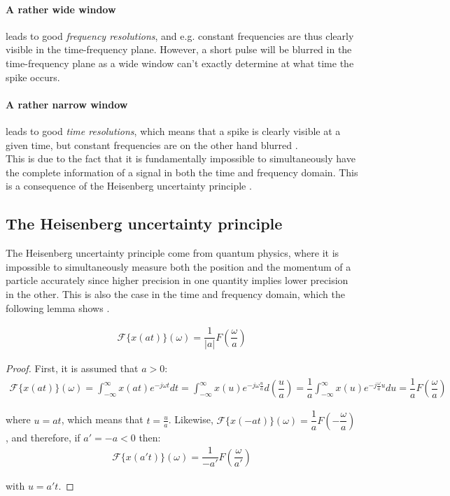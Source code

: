 \paragraph{A rather wide window} leads to good \textit{frequency resolutions}, and e.g. constant frequencies are thus clearly visible in the time-frequency plane. However, a short pulse will be blurred in the time-frequency plane as a wide window can't exactly determine at what time the spike occurs.
\paragraph{A rather narrow window} leads to good \textit{time resolutions}, which means that a spike is clearly visible at a given time, but constant frequencies are on the other hand blurred \cite{Davis}. \\
This is due to the fact that it is fundamentally impossible to simultaneously have the complete information of a signal in both the time and frequency domain. This is a consequence of the Heisenberg uncertainty principle \cite{Wang}.

\subsection{The Heisenberg uncertainty principle}
The Heisenberg uncertainty principle come from quantum physics, where it is impossible to simultaneously measure both the position and the momentum of a particle accurately since higher precision in one quantity implies lower precision in the other. This is also the case in the time and frequency domain, which the following lemma shows \cite{page 123, Wang}.

\begin{lemma}
\begin{align*}
\mathcal{F}\{x(at)\}(\omega) = \dfrac{1}{|a|}F\left(\dfrac{\omega}{a}\right)
\end{align*}
\end{lemma}

\begin{proof}
First, it is assumed that $a > 0$:
\begin{align*}
\mathcal{F}\{x(at)\}(\omega) = \int_{-\infty}^\infty x(at)e^{-j\omega t} dt = \int_{-\infty}^\infty x(u) e^{-j\omega \frac{u}{a}} d\left(\dfrac{u}{a}\right) = \dfrac{1}{a} \int_{-\infty}^\infty x(u) e^{-j\frac{\omega}{a} u} du = \dfrac{1}{a} F\left(\dfrac{\omega}{a}\right)
\end{align*}

where $u = at$, which means that $t = \frac{u}{a}$. Likewise, $\mathcal{F}\{x(-at)\}(\omega) = \dfrac{1}{a} F\left(- \dfrac{\omega}{a}\right)$, and therefore, if $a' = -a < 0$ then:
\begin{align*}
\mathcal{F}\{x(a't)\}(\omega) = \dfrac{1}{-a'} F\left(\dfrac{\omega}{a'}\right)
\end{align*}

with $u = a't$.
\end{proof}

